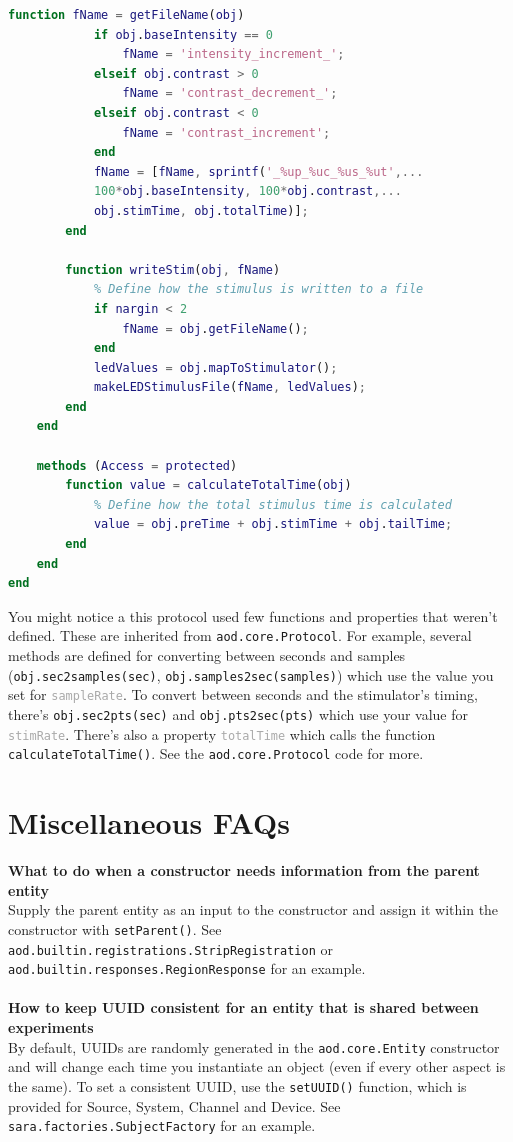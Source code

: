 \documentclass[10pt]{exam}
\newcommand\aodclass[1]{\textcolor{codeblue}{\texttt{#1}}}
\newcommand\aodprop[1]{\textcolor{darkgray}{\texttt{#1}}}
\newcommand\aodfcn[1]{\textcolor{darkteal}{\texttt{#1}}}
\begin{document}
\begin{lstlisting}[language=matlab]
		function fName = getFileName(obj)
			if obj.baseIntensity == 0
				fName = 'intensity_increment_';
			elseif obj.contrast > 0
				fName = 'contrast_decrement_';
			elseif obj.contrast < 0
				fName = 'contrast_increment';
			end
			fName = [fName, sprintf('_%up_%uc_%us_%ut',...
			100*obj.baseIntensity, 100*obj.contrast,... 
			obj.stimTime, obj.totalTime)];
		end
			
		function writeStim(obj, fName)
			% Define how the stimulus is written to a file
			if nargin < 2
				fName = obj.getFileName();
			end
			ledValues = obj.mapToStimulator();
			makeLEDStimulusFile(fName, ledValues);
		end
	end

	methods (Access = protected)
		function value = calculateTotalTime(obj)
			% Define how the total stimulus time is calculated
			value = obj.preTime + obj.stimTime + obj.tailTime;
		end
	end
end
		\end{lstlisting}
	\noindent 
	You might notice a this protocol used few functions and properties that weren't defined. These are inherited from \aodclass{aod.core.Protocol}. For example, several methods are defined for converting between seconds and samples (\aodfcn{obj.sec2samples(sec)}, \aodfcn{obj.samples2sec(samples)}) which use the value you set for \aodprop{sampleRate}. To convert between seconds and the stimulator's timing, there's \aodfcn{obj.sec2pts(sec)} and \aodfcn{obj.pts2sec(pts)} which use your value for \aodprop{stimRate}. There's also a property \aodprop{totalTime} which calls the function \aodfcn{calculateTotalTime()}. See the \aodclass{aod.core.Protocol} code for more.	

\section{Miscellaneous FAQs}
	\label{section:Misc}
	\noindent\textbf{What to do when a constructor needs information from the parent entity}\\
	Supply the parent entity as an input to the constructor and assign it within the constructor with \aodfcn{setParent()}. See \aodclass{aod.builtin.registrations.StripRegistration} or \aodclass{aod.builtin.responses.RegionResponse} for an example.
	\\$\quad$\\
	\noindent\textbf{How to keep UUID consistent for an entity that is shared between experiments}\\
	By default, UUIDs are randomly generated in the \aodclass{aod.core.Entity} constructor and will change each time you instantiate an object (even if every other aspect is the same). To set a consistent UUID, use the \aodfcn{setUUID()} function, which is provided for Source, System, Channel and Device. See \aodclass{sara.factories.SubjectFactory} for an example.
	
\end{document}
